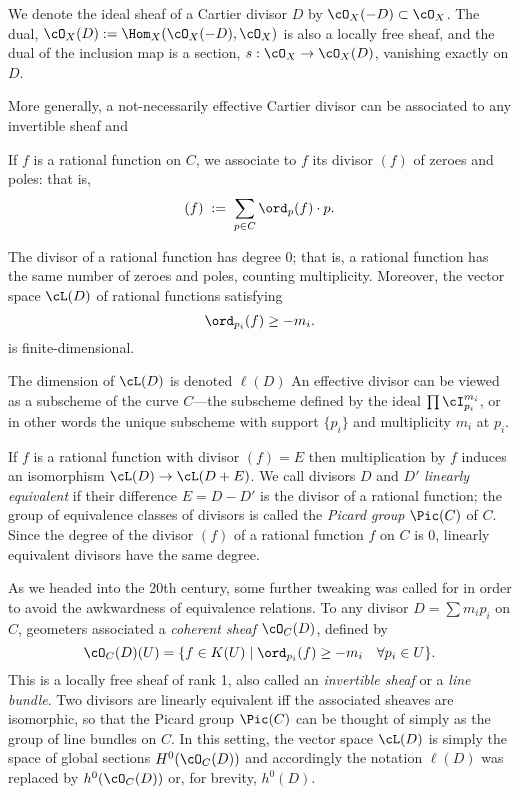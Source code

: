We denote the ideal sheaf of a Cartier divisor $D$ by
$\cO_{X}(-D) \subset \cO_{X}$. The dual, $\cO_{X}(D) := \Hom_{X}(\cO_{X}(-D), \cO_{X})$
is also a locally free sheaf, and the dual of the inclusion map is a section, $s:\cO_{X} \to \cO_{X}(D)$, vanishing exactly on $D$. 

More generally, a not-necessarily effective Cartier divisor can be associated to any
invertible sheaf and 

If $f$ is a rational function on $C$, we associate to $f$ its divisor $(f)$ of zeroes and poles: that is,
$$
(f) \; := \; \sum_{p \in C} \ord_p(f)\cdot p.
$$


\begin{proposition}
The divisor of a rational function has degree 0; that is, a rational function has the same number of zeroes and poles, counting multiplicity. Moreover, the vector space $\cL(D)$ of rational functions satisfying
\begin{equation}\label{divisor condition}
\ord_{p_i}(f) \geq -m_i.
\end{equation}
 is finite-dimensional.
\end{proposition}

The dimension of $\cL(D)$ is denoted $\ell(D)$
An effective divisor can be viewed as a subscheme of the curve $C$---the subscheme defined by the ideal $\prod \cI_{p_i}^{m_i}$, or in other words the unique subscheme with support $\{p_i\}$ and multiplicity $m_i$ at $p_i$.

If $f$ is a rational function with divisor $(f) = E$ then  multiplication by $f$ induces an isomorphism $\cL(D) \to \cL(D+E)$. We call divisors $D$ and $D'$ \emph{linearly equivalent} if their difference $E = D - D'$ is the divisor of a rational function; the group of equivalence classes of divisors is called the \emph{Picard group} $\Pic(C)$ of $C$. Since the degree of the divisor $(f)$ of a rational function $f$ on $C$ is 0, linearly equivalent divisors have the same degree.

As we headed into the 20th century, some further tweaking was called for in order to avoid the awkwardness of equivalence relations. To any divisor $D = \sum m_ip_i$ on $C$, geometers associated a \emph{coherent sheaf} $\cO_C(D)$, defined by
$$
\cO_C(D)(U) = \{ f \in K(U) \mid \ord_{p_i}(f) \geq -m_i \quad \forall p_i \in U \}.
$$
This is a locally free sheaf of rank 1, also called an \emph{invertible sheaf} or a \emph{line bundle}. Two divisors are linearly equivalent iff the associated sheaves are isomorphic, so that the Picard group $\Pic(C)$ can be thought of simply as the group of line bundles on $C$. In this setting, the vector space $\cL(D)$ is simply the space of global sections $H^0(\cO_C(D))$ and accordingly the notation $\ell(D)$ was replaced by $h^0(\cO_C(D))$ or, for brevity, $h^0(D)$. 

